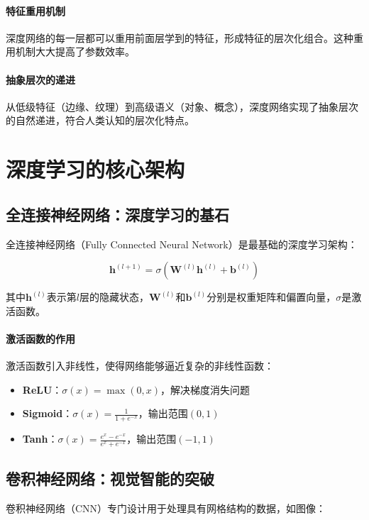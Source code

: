 \paragraph{特征重用机制}
深度网络的每一层都可以重用前面层学到的特征，形成特征的层次化组合。这种重用机制大大提高了参数效率。

\paragraph{抽象层次的递进}
从低级特征（边缘、纹理）到高级语义（对象、概念），深度网络实现了抽象层次的自然递进，符合人类认知的层次化特点。

\section{深度学习的核心架构}

\subsection{全连接神经网络：深度学习的基石}

全连接神经网络（Fully Connected Neural Network）是最基础的深度学习架构：

$$\mathbf{h}^{(l+1)} = \sigma(\mathbf{W}^{(l)} \mathbf{h}^{(l)} + \mathbf{b}^{(l)})$$

其中$\mathbf{h}^{(l)}$表示第$l$层的隐藏状态，$\mathbf{W}^{(l)}$和$\mathbf{b}^{(l)}$分别是权重矩阵和偏置向量，$\sigma$是激活函数。

\paragraph{激活函数的作用}
激活函数引入非线性，使得网络能够逼近复杂的非线性函数：

\begin{itemize}
\item \textbf{ReLU}：$\sigma(x) = \max(0, x)$，解决梯度消失问题
\item \textbf{Sigmoid}：$\sigma(x) = \frac{1}{1+e^{-x}}$，输出范围$(0,1)$
\item \textbf{Tanh}：$\sigma(x) = \frac{e^x - e^{-x}}{e^x + e^{-x}}$，输出范围$(-1,1)$
\end{itemize}

\subsection{卷积神经网络：视觉智能的突破}

卷积神经网络（CNN）专门设计用于处理具有网格结构的数据，如图像：

